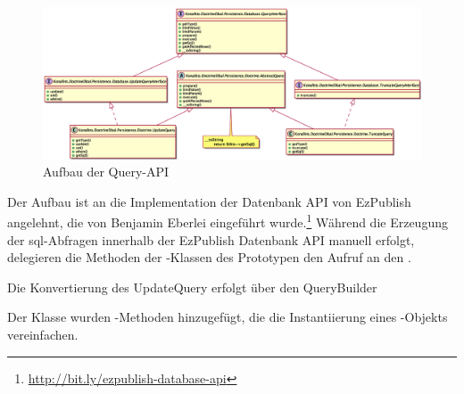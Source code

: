 \begin{figure}[H]
    \centering
    \includegraphics[scale=0.5, angle=90]{gfx/uml/NewAPI/UpdateQuery.eps}
    \caption{Aufbau der Query-API}
    \label{fig:newQueryAPI}
\end{figure}

Der Aufbau ist an die Implementation der Datenbank API von EzPublish angelehnt, die von Benjamin Eberlei eingeführt wurde.\footnote{\url{http://bit.ly/ezpublish-database-api}} Während die Erzeugung der \gls{sql}-Abfragen innerhalb der EzPublish Datenbank API manuell erfolgt, delegieren die Methoden der -Klassen des Prototypen den Aufruf an den .

\begin{listing}[H]
\caption{Die Konvertierung des UpdateQuery erfolgt über den QueryBuilder}
\label{lst:getSqlMethodOfUpdateQuery}
\end{listing}

Der Klasse \phpinline{\Konafets\DoctrineDbal\Persistence\Doctrine\DatabaseConnection} wurden -Methoden hinzugefügt, die die Instantiierung eines -Objekts vereinfachen.

